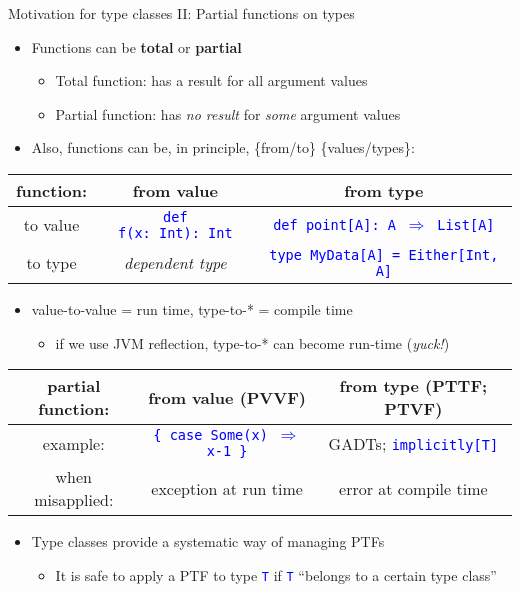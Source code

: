 \documentclass[english]{beamer}
\providecommand{\tabularnewline}{\\}
\begin{document}
\begin{frame}{Motivation for type classes II: Partial functions on types}

\begin{itemize}
\item Functions can be \textbf{total} or \textbf{partial}
\begin{itemize}
\item Total function: has a result for all argument values
\item Partial function: has \emph{no result} for \emph{some} argument values
\end{itemize}
\item Also, functions can be, in principle, \{from/to\} \{values/types\}:
\end{itemize}
\begin{center}
\begin{tabular}{|c|c|c|}
\hline 
function: &
from value &
from type\tabularnewline
\hline 
\hline 
to value &
\texttt{\textcolor{blue}{\footnotesize{}def f(x:\ Int):\ Int}} &
\texttt{\textcolor{blue}{\footnotesize{}def point{[}A{]}: A $\Rightarrow$
List{[}A{]}}}\tabularnewline
\hline 
to type &
\emph{dependent type} &
\texttt{\textcolor{blue}{\footnotesize{}type MyData{[}A{]} = Either{[}Int,
A{]}}}\tabularnewline
\hline 
\end{tabular}
\par\end{center}
\begin{itemize}
\item value-to-value = run time, type-to-{*} = compile time
\begin{itemize}
\item if we use JVM reflection, type-to-{*} can become run-time (\emph{yuck!})
\end{itemize}
\end{itemize}
\begin{center}
\begin{tabular}{|c|c|c|}
\hline 
partial function: &
from value (PVVF) &
from type (PTTF; PTVF)\tabularnewline
\hline 
\hline 
example: &
\texttt{\textcolor{blue}{\footnotesize{}\{ case Some(x) $\Rightarrow$
x-1 \}}} &
GADTs; \texttt{\textcolor{blue}{\footnotesize{}implicitly{[}T{]}}}\tabularnewline
\hline 
when misapplied: &
exception at run time &
error at compile time\tabularnewline
\hline 
\end{tabular}
\par\end{center}
\begin{itemize}
\item Type classes provide a systematic way of managing PTFs
\begin{itemize}
\item It is safe to apply a PTF to type \texttt{\textcolor{blue}{\footnotesize{}T}}
if \texttt{\textcolor{blue}{\footnotesize{}T}} ``belongs to a certain
type class''
\end{itemize}
\end{itemize}
\end{frame}
\end{document}
